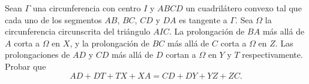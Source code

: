 Sean $\Gamma$ una circunferencia con centro $I$ y $ABCD$ un cuadrilátero convexo tal que cada uno de los segmentos $AB$, $BC$, $CD$ y $DA$ es tangente a $\Gamma$. Sea $\Omega$ la circunferencia circunscrita del triángulo $AIC$. La prolongación de $BA$ más allá de $A$ corta a $\Omega$ en $X$, y la prolongación de $BC$ más allá de $C$ corta a $\Omega$ en $Z$. Las prolongaciones de $AD$ y $CD$ más allá de $D$ cortan a $\Omega$ en $Y$ y $T$ respectivamente. Probar que
\[A D+D T+T X+X A=C D+D Y+Y Z+Z C.\]
